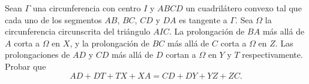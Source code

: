 Sean $\Gamma$ una circunferencia con centro $I$ y $ABCD$ un cuadrilátero convexo tal que cada uno de los segmentos $AB$, $BC$, $CD$ y $DA$ es tangente a $\Gamma$. Sea $\Omega$ la circunferencia circunscrita del triángulo $AIC$. La prolongación de $BA$ más allá de $A$ corta a $\Omega$ en $X$, y la prolongación de $BC$ más allá de $C$ corta a $\Omega$ en $Z$. Las prolongaciones de $AD$ y $CD$ más allá de $D$ cortan a $\Omega$ en $Y$ y $T$ respectivamente. Probar que
\[A D+D T+T X+X A=C D+D Y+Y Z+Z C.\]
